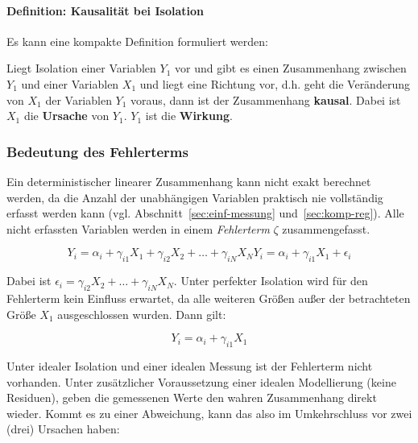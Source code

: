 \documentclass{article}
\numberwithin{equation}{section}
\begin{document}
\paragraph*{Definition: Kausalität bei Isolation}

Es kann eine kompakte Definition formuliert werden:

Liegt Isolation einer Variablen $Y_1$ vor und gibt es einen Zusammenhang zwischen $Y_1$ und einer Variablen $X_1$ und liegt eine Richtung vor, d.h. geht die Veränderung von $X_1$ der Variablen $Y_1$ voraus, dann ist der Zusammenhang \textbf{kausal}. Dabei ist $X_1$ die \textbf{Ursache} von $Y_1$. $Y_1$ ist die \textbf{Wirkung}.

\subsubsection{Bedeutung des Fehlerterms}
\label{sec:kausa-fehler}

Ein deterministischer linearer Zusammenhang kann nicht exakt berechnet werden, da die Anzahl der unabhängigen Variablen praktisch nie vollständig erfasst werden kann (vgl. Abschnitt~\ref{sec:einf-messung} und~\ref{sec:komp-reg}). Alle nicht erfassten Variablen werden in einem \emph{Fehlerterm} $\zeta$ zusammengefasst.

\begin{subequations}
\begin{equation}
Y_i = \alpha_i + \gamma_{i1} X_1 + \gamma_{i2} X_2 + \dots + \gamma_{iN} X_N
\end{equation}
\begin{equation}
Y_i = \alpha_i + \gamma_{i1} X_1 + \epsilon_i
\end{equation}
\end{subequations}

Dabei ist $\epsilon_i = \gamma_{i2} X_2 + \dots + \gamma_{iN} X_N$. Unter perfekter Isolation wird für den Fehlerterm kein Einfluss erwartet, da alle weiteren Größen außer der betrachteten Größe $X_1$ ausgeschlossen wurden. Dann gilt:

\begin{equation}
Y_i = \alpha_i + \gamma_{i1} X_1
\end{equation}

Unter idealer Isolation und einer idealen Messung ist der Fehlerterm nicht vorhanden. Unter zusätzlicher Voraussetzung einer idealen Modellierung (keine Residuen), geben die gemessenen Werte den wahren Zusammenhang direkt wieder. Kommt es zu einer Abweichung, kann das also im Umkehrschluss vor zwei (drei) Ursachen haben:
\end{document}
